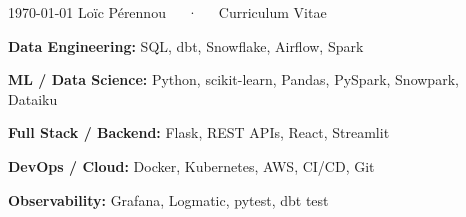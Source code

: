 \documentclass[11pt, a4paper]{awesome-cv}
\begin{document}
\makecvheader[L]

\makecvfooter
  {\today}
  {Loïc Pérennou~~~·~~~Curriculum Vitae}
  {\thepage}


\vspace{-0.2cm}


\vspace{0.2cm}
\fontsize{9pt}{1em}\bodyfontlight\selectfont
\begin{cvitems}
  \item{\textbf{Data Engineering:} SQL, dbt, Snowflake, Airflow, Spark}
  \item{\textbf{ML / Data Science:} Python, scikit-learn, Pandas, PySpark, Snowpark, Dataiku}
  \item{\textbf{Full Stack / Backend:} Flask, REST APIs, React, Streamlit}
  \item{\textbf{DevOps / Cloud:} Docker, Kubernetes, AWS, CI/CD, Git}
  \item{\textbf{Observability:} Grafana, Logmatic, pytest, dbt test}
\end{cvitems}




%
%
%
%
%



\end{document}
